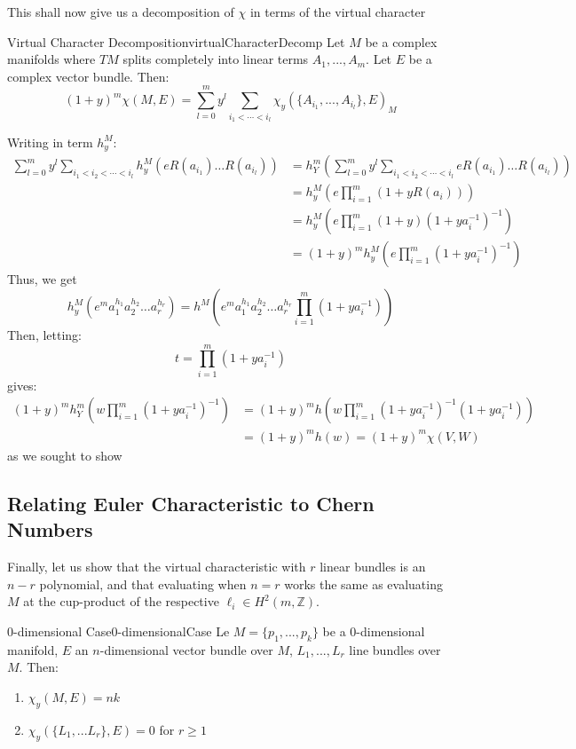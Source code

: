 \documentclass{book}
\newenvironment{Proof}[1][]
  {\begin{ProofTcb}[#1]}
  {\end{ProofTcb}}
\newcommand{\Z}{{\mathbb{Z}}}
\begin{document}
This shall now give us a decomposition of $\chi$ in terms of the virtual character

\begin{thm}{Virtual Character Decomposition}{virtualCharacterDecomp}
  Let $M$ be a complex manifolds where $TM$ splits completely into linear terms $A_1, ..., A_m$. Let $E$
  be a complex vector bundle. Then:
  \[
    (1+y)^m \chi(M, E) = \sum_{l=0}^m y^l \sum_{i_1 < \cdots < i_l} \chi_y(\{A_{i_1}, ..., A_{i_l}\}, E)_M
  \]
\end{thm}

\begin{Proof}
    Writing in term $h_y^M$:
  \begin{align*}
      \sum_{l=0}^m y^l \sum_{i_1<i_2<\cdots<i_l} h_y^M(eR(a_{i_1})\ldots R(a_{i_l})) &= h_Y^m\left(\sum_{l=0}^m y^l \sum_{i_1<i_2<\cdots<i_l} eR(a_{i_1})\ldots R(a_{i_l})\right) \\
      &= h_y^M\left(e\prod_{i=1}^m(1+yR(a_i))\right) \\
      &= h_y^M\left(e\prod_{i=1}^m(1+y)(1+ya_i^{-1})^{-1}\right) \\
      &= (1+y)^mh_y^M\left(e\prod_{i=1}^m(1+ya_i^{-1})^{-1}\right)
  \end{align*}
  Thus, we get
  \[
      h_y^M(e^m a_1^{h_1}a_2^{h_2}\ldots a_r^{h_r}) = h^M\left(e^m a_1^{h_1}a_2^{h_2}\ldots a_r^{h_r}\prod_{i=1}^m(1+ya_i^{-1})\right)
  \]
  Then, letting:
  \[
      t = \prod_{i=1}^m(1+ya_i^{-1})
  \]
  gives:
  \begin{align*}
      (1+y)^mh_Y^m\left(w\prod_{i=1}^m(1+ya_i^{-1})^{-1}\right) &= (1+y)^mh\left(w\prod_{i=1}^m(1+ya_i^{-1})^{-1}(1+ya_i^{-1})\right) \\
      &= (1+y)^mh(w) = (1+y)^m\chi(V,W)
  \end{align*}
  as we sought to show
\end{Proof}






\subsection{Relating Euler Characteristic to Chern Numbers}\label{sec:virtualEulerCharOnProjVar}

Finally, let us show that the virtual characteristic with $r$ linear bundles is an $n-r$ polynomial, and that
evaluating when $n=r$ works the same as evaluating $M$ at the cup-product of the respective $\ell_i \in H^2(m
,\Z)$.

\begin{lem}{0-dimensional Case}{0-dimensionalCase}
  Le $M = \{p_1, ..., p_k\}$ be a $0$-dimensional manifold, $E$ an $n$-dimensional vector bundle over $M$, $L_1, ..., L_r$ line
  bundles over $M$. Then:
  \begin{enumerate}
    \item $\chi_y(M, E) = nk$
  \item $\chi_y(\{L_1, ... L_r\}, E) = 0$ for $r \ge 1$
  \end{enumerate}
\end{lem}
\end{document}
